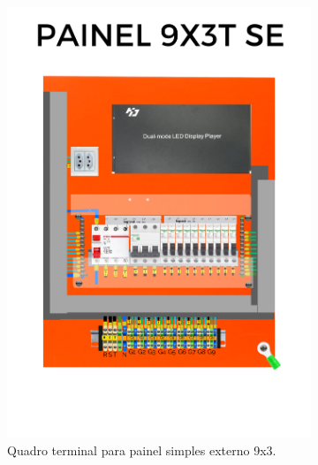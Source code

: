 \begin{figure}
\begin{subfigure}{0.4\textwidth}
    \includegraphics[width=\textwidth]{image/10.png}
    \caption{Quadro terminal para painel simples externo 9x3.}
    \label{fig:advQD_2}
\end{subfigure}
\begin{subfigure}{0.4\textwidth}

\end{subfigure}
\end{figure}
